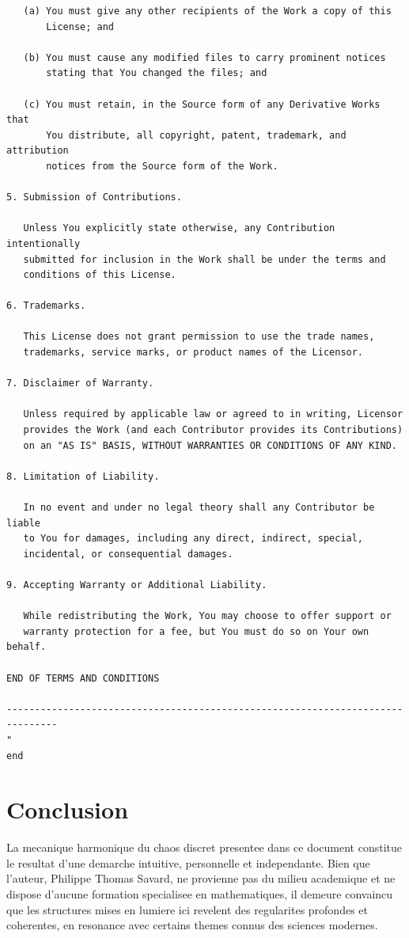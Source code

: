 \documentclass[12pt,a4paper]{article}
\theoremstyle{definition}
\theoremstyle{remark}
\begin{document}
\begin{verbatim}
   (a) You must give any other recipients of the Work a copy of this
       License; and

   (b) You must cause any modified files to carry prominent notices
       stating that You changed the files; and

   (c) You must retain, in the Source form of any Derivative Works that
       You distribute, all copyright, patent, trademark, and attribution
       notices from the Source form of the Work.

5. Submission of Contributions.

   Unless You explicitly state otherwise, any Contribution intentionally
   submitted for inclusion in the Work shall be under the terms and
   conditions of this License.

6. Trademarks.

   This License does not grant permission to use the trade names,
   trademarks, service marks, or product names of the Licensor.

7. Disclaimer of Warranty.

   Unless required by applicable law or agreed to in writing, Licensor
   provides the Work (and each Contributor provides its Contributions)
   on an "AS IS" BASIS, WITHOUT WARRANTIES OR CONDITIONS OF ANY KIND.

8. Limitation of Liability.

   In no event and under no legal theory shall any Contributor be liable
   to You for damages, including any direct, indirect, special,
   incidental, or consequential damages.

9. Accepting Warranty or Additional Liability.

   While redistributing the Work, You may choose to offer support or
   warranty protection for a fee, but You must do so on Your own behalf.

END OF TERMS AND CONDITIONS

-------------------------------------------------------------------------------
"
end
\end{verbatim}

\section{Conclusion}

La mecanique harmonique du chaos discret presentee dans ce document constitue
le resultat d'une demarche intuitive, personnelle et independante. Bien que
l'auteur, Philippe Thomas Savard, ne provienne pas du milieu academique et ne
dispose d'aucune formation specialisee en mathematiques, il demeure convaincu
que les structures mises en lumiere ici revelent des regularites profondes et
coherentes, en resonance avec certains themes connus des sciences modernes.
\end{document}
